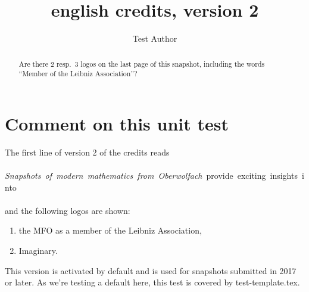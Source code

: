 \documentclass{snapshotmfo}
\author{Test Author}
\title{english credits, version 2}
\begin{document}

\begin{abstract}
Are there 2 resp.\ 3 logos on the last page of this snapshot, including the words ``Member of the Leibniz Association''?
\end{abstract}

\section{Comment on this unit test}
The first line of version 2 of the credits reads\\
\\
\hbox{\emph{Snapshots of modern mathematics from Oberwolfach} provide exciting insights into}\\
\\
and the following logos are shown:
\begin{enumerate}
  \item the MFO as a member of the Leibniz Association,
  \item Imaginary.
\end{enumerate}
This version is activated by default
and is used for snapshots submitted in 2017 or later.
As we're testing a default here, this test is covered by test-template.tex.
\end{document}
